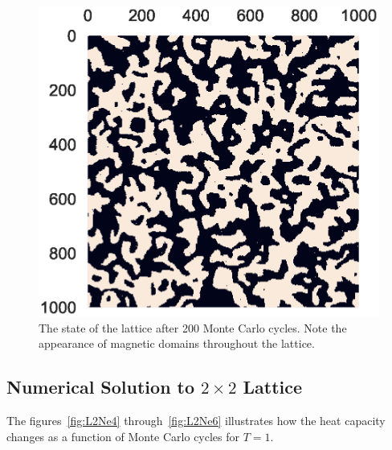 \documentclass[aps,reprint]{revtex4-1}
\begin{document}
\begin{figure}[H]
  \centering
  \includegraphics[width=\columnwidth]{figures/final.eps}
  \caption{\label{fig:final} The state of the lattice after 200 Monte Carlo
    cycles. Note the appearance of magnetic domains throughout the lattice.}
\end{figure}

\subsection{Numerical Solution to $2\times 2$ Lattice}
\label{sec:numer-solut-2tim}

The figures~\ref{fig:L2Ne4} through~\ref{fig:L2Ne6} illustrates how the heat
capacity changes as a function of Monte Carlo cycles for \(T = 1\).
\end{document}
